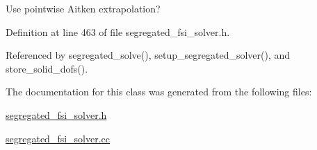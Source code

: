 Use pointwise Aitken extrapolation? 



Definition at line 463 of file segregated\+\_\+fsi\+\_\+solver.\+h.



Referenced by segregated\+\_\+solve(), setup\+\_\+segregated\+\_\+solver(), and store\+\_\+solid\+\_\+dofs().



The documentation for this class was generated from the following files\+:\begin{DoxyCompactItemize}
\item 
\hyperlink{segregated__fsi__solver_8h}{segregated\+\_\+fsi\+\_\+solver.\+h}\item 
\hyperlink{segregated__fsi__solver_8cc}{segregated\+\_\+fsi\+\_\+solver.\+cc}\end{DoxyCompactItemize}
